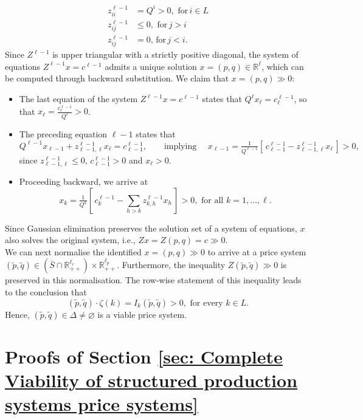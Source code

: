 \documentclass[11pt,fleqn]{article}
\begin{document}
\begin{align*}
z^{\ell -1}_{ii} &= Q^i >0,\,\,\mbox{for}\, i \in L \\[1ex]
z^{\ell -1}_{ij}& \leqslant 0,\,\,\mbox{for}\, j>i \\[1ex]
z^{\ell -1}_{ij}&=0,\,\mbox{for}\, j < i.
\end{align*}
Since $Z^{\ell -1}$ is upper triangular with a strictly positive diagonal, the system of equations $Z^{\ell -1} x = c^{\ell -1}$ admits a unique solution $x = (p,q) \in \mathbb R^\ell$, which can be computed through backward substitution. We claim that $x = (p,q) \gg 0 \colon$
\begin{itemize}
	\item The last equation of the system $Z^{\ell -1} x = c^{\ell -1}$ states that $Q^\ell x_\ell =c^{\ell -1}_\ell$, so that $x_\ell = \tfrac{c^{\ell -1}_\ell}{Q^\ell} >0$.
	\item The preceding equation $\ell -1$ states that
	\[
	Q^{\ell -1} x_{\ell -1} + z^{\ell -1}_{\ell -1, \ell} x_\ell = c^{\ell -1}_{\ell -1}, \qquad \mbox{implying } \quad x_{\ell -1} = \tfrac{1}{Q^{\ell -1}} \left[ \, c^{\ell -1}_{\ell -1} - z^{\ell -1}_{\ell -1, \ell} x_\ell \, \right] >0,
	\]
	since $z^{\ell -1}_{\ell -1, \ell}  \leqslant 0$, $c^{\ell -1}_{\ell -1} >0$ and $x_\ell >0$.
	\item Proceeding backward, we arrive at
	\[
	x_{k} = \tfrac{1}{Q^{k}} \left[ \, c^{\ell -1}_{k} - \sum_{h>k} z^{\ell -1}_{k, h} x_h \, \right] >0,\,\, \mbox{for all } k=1, \ldots , \ell .
	\]
\end{itemize}
Since Gaussian elimination preserves the solution set of a system of equations, $x$ also solves the original system, i.e., $Zx = Z(p,q) = c \gg 0$. \\
We can next normalise the identified $x= (p,q) \gg 0$ to arrive at a price system $( \tilde p , \tilde q) \in  (\bar S\cap \mathbb R^{\ell_c}_{++}) \times \mathbb R^{\ell_p}_{++}$. Furthermore, the inequality $Z (\tilde p, \tilde q) \gg 0$ is preserved in this normalisation. The row-wise statement of this inequality leads to the conclusion that 
\[
( \tilde p, \tilde q) \cdot \zeta (k) = I_k ( \tilde p, \tilde q) >0,\,\, \mbox{for every $k \in L$.}
\]
Hence, $( \tilde p, \tilde q) \in \Delta \neq \varnothing$ is a viable price system.


\section{Proofs of Section \ref{sec: Complete Viability of structured production systems price systems}}\label{sec: app B}
\end{document}

